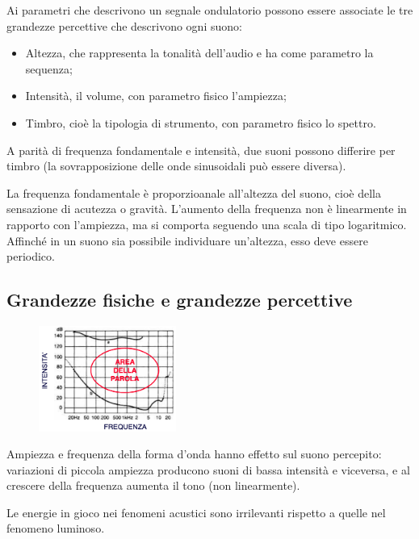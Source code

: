 Ai parametri che descrivono un segnale ondulatorio possono essere associate le tre grandezze percettive che descrivono ogni suono:
\begin{itemize}
	\item Altezza, che rappresenta la tonalità dell'audio e ha come parametro la sequenza;
	\item Intensità, il volume, con parametro fisico l'ampiezza;
	\item Timbro, cioè la tipologia di strumento, con parametro fisico lo spettro.
\end{itemize}

A parità di frequenza fondamentale e intensità, due suoni possono differire per timbro (la sovrapposizione delle onde sinusoidali può essere diversa).

La frequenza fondamentale è proporzioanale all'altezza del suono, cioè della sensazione di acutezza o gravità. L'aumento della frequenza non è linearmente in rapporto con l'ampiezza, ma si comporta seguendo una scala di tipo logaritmico. Affinché in un suono sia possibile individuare un'altezza, esso deve essere periodico. 

\subsection{Grandezze fisiche e grandezze percettive}

 \begin{figure}
	\vspace{-15pt}
	\includegraphics[width=0.4\textwidth]{Lezioni/Immagini/parola}
	\vspace{-40pt}
\end{figure}

Ampiezza e frequenza della forma d'onda hanno effetto sul suono percepito: variazioni di piccola ampiezza producono suoni di bassa intensità e viceversa, e al crescere della frequenza aumenta il tono (non linearmente).

Le energie in gioco nei fenomeni acustici sono irrilevanti rispetto a quelle nel fenomeno luminoso. 

